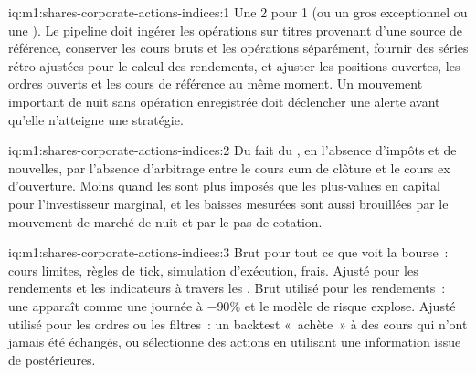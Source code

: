 \begin{solution}{iq:m1:shares-corporate-actions-indices:1}
Une  2 pour 1 (ou un gros  exceptionnel ou une ). Le pipeline doit
ingérer les opérations sur titres provenant d'une source de référence, conserver les cours bruts et
les opérations séparément, fournir des séries rétro-ajustées pour le calcul des rendements, et
ajuster les positions ouvertes, les ordres ouverts et les cours de référence au même moment.
Un mouvement important de nuit sans opération enregistrée doit déclencher une alerte avant
qu'elle n'atteigne une stratégie.
\end{solution}

\begin{solution}{iq:m1:shares-corporate-actions-indices:2}
Du fait du , en l'absence d'impôts et de nouvelles, par l'absence d'arbitrage entre le cours
cum de clôture et le cours ex d'ouverture. Moins quand les  sont plus imposés que les plus-values en capital
pour l'investisseur marginal, et les baisses mesurées sont aussi brouillées par le
mouvement de marché de nuit et par le pas de cotation.
\end{solution}

\begin{solution}{iq:m1:shares-corporate-actions-indices:3}
Brut pour tout ce que voit la bourse~: cours limites, règles de tick, simulation
d'exécution, frais. Ajusté pour les rendements et les indicateurs à travers les . Brut
utilisé pour les rendements~: une  apparaît comme une journée à $-90\%$ et le modèle de risque
explose. Ajusté utilisé pour les ordres ou les filtres~: un backtest «~achète~» à des cours
qui n'ont jamais été échangés, ou sélectionne des actions en utilisant une information issue de  postérieures.
\end{solution}


